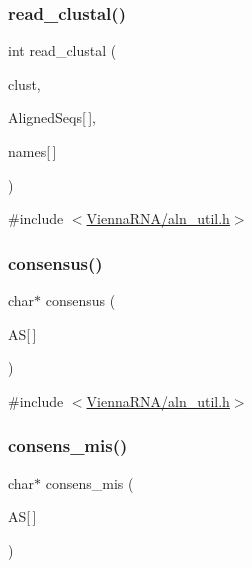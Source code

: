 \subsubsection{\texorpdfstring{read\+\_\+clustal()}{read\_clustal()}}
{\footnotesize\ttfamily int read\+\_\+clustal (\begin{DoxyParamCaption}\item[{F\+I\+LE $\ast$}]{clust,  }\item[{char $\ast$}]{Aligned\+Seqs\mbox{[}$\,$\mbox{]},  }\item[{char $\ast$}]{names\mbox{[}$\,$\mbox{]} }\end{DoxyParamCaption})}



{\ttfamily \#include $<$\mbox{\hyperlink{aln__util_8h}{Vienna\+R\+N\+A/aln\+\_\+util.\+h}}$>$}

\mbox{\label{group__aln__utils_ga8e8b805faaf6dee2feb4cbc38ba48e71}} 
\subsubsection{\texorpdfstring{consensus()}{consensus()}}
{\footnotesize\ttfamily char$\ast$ consensus (\begin{DoxyParamCaption}\item[{const char $\ast$}]{AS\mbox{[}$\,$\mbox{]} }\end{DoxyParamCaption})}



{\ttfamily \#include $<$\mbox{\hyperlink{aln__util_8h}{Vienna\+R\+N\+A/aln\+\_\+util.\+h}}$>$}

\mbox{\label{group__aln__utils_gab8c6d748a1b44e516759233879dadcc7}} 
\subsubsection{\texorpdfstring{consens\+\_\+mis()}{consens\_mis()}}
{\footnotesize\ttfamily char$\ast$ consens\+\_\+mis (\begin{DoxyParamCaption}\item[{const char $\ast$}]{AS\mbox{[}$\,$\mbox{]} }\end{DoxyParamCaption})}



